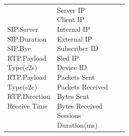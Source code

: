 \begin{description}
\begin{longtable}{p{}|p{}|p{}|p{}}
{                                                            SIP.Server\\
                                                            SIP.Duration\\
                                                            SIP.Bye\\
                                                            RTP.Payload\\ Type(c2s)\\
                                                            RTP.Payload\\ Type(s2c)\\
                                                            RTP.Direction\\
                                                            Receive Time
                                                            }
                                                    &   \tabincell{l}{Server IP\\
                                                                            Client IP\\
                                                                            Internal IP\\
                                                                            External IP\\
                                                                            Subscriber ID\\
                                                                            Sled IP\\
                                                                            Device ID\\
                                                                            Packets Sent\\
                                                                            Packets Received\\
                                                                            Bytes Sent\\
                                                                            Bytes Received\\
                                                                            Sessions\\
                                                                            Duration(ms)\\
}
\end{longtable}
\end{description}
